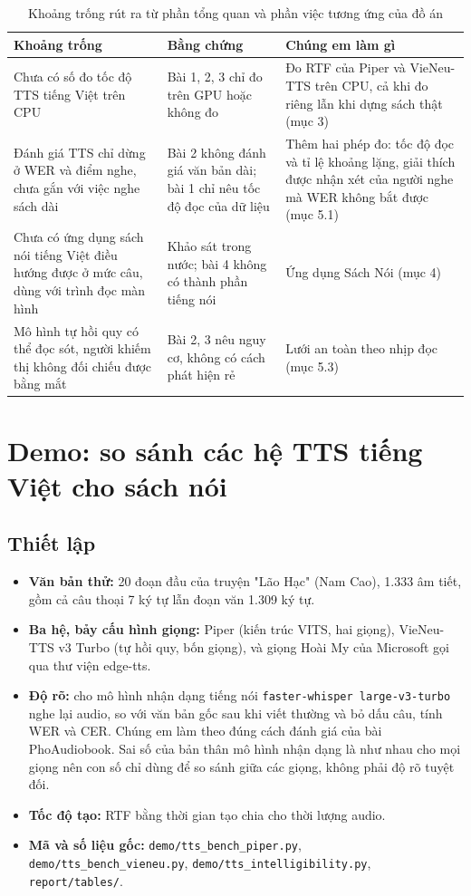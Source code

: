 \documentclass[12pt,a4paper]{article}
\providecommand{\tightlist}{\setlength{\itemsep}{2pt}\setlength{\parskip}{0pt}}
\begin{document}
{\small
\begin{longtable}[]{@{}>{\raggedright\arraybackslash}p{4.0cm}>{\raggedright\arraybackslash}p{4.4cm}>{\raggedright\arraybackslash}p{5.9cm}@{}}
\caption{Khoảng trống rút ra từ phần tổng quan và phần việc tương ứng của đồ án}\label{tab:khoang-trong}\\
\toprule\noalign{}
Khoảng trống & Bằng chứng & Chúng em làm gì \\
\midrule\noalign{}
\endhead
\bottomrule\noalign{}
\endlastfoot
Chưa có số đo tốc độ TTS tiếng Việt trên CPU & Bài 1, 2, 3 chỉ đo trên GPU hoặc không đo & Đo RTF của Piper và VieNeu-TTS trên CPU, cả khi đo riêng lẫn khi dựng sách thật (mục 3) \\
Đánh giá TTS chỉ dừng ở WER và điểm nghe, chưa gắn với việc nghe sách dài & Bài 2 không đánh giá văn bản dài; bài 1 chỉ nêu tốc độ đọc của dữ liệu & Thêm hai phép đo: tốc độ đọc và tỉ lệ khoảng lặng, giải thích được nhận xét của người nghe mà WER không bắt được (mục 5.1) \\
Chưa có ứng dụng sách nói tiếng Việt điều hướng được ở mức câu, dùng với trình đọc màn hình & Khảo sát trong nước; bài 4 không có thành phần tiếng nói & Ứng dụng Sách Nói (mục 4) \\
Mô hình tự hồi quy có thể đọc sót, người khiếm thị không đối chiếu được bằng mắt & Bài 2, 3 nêu nguy cơ, không có cách phát hiện rẻ & Lưới an toàn theo nhịp đọc (mục 5.3) \\
\end{longtable}
}

\section{Demo: so sánh các hệ TTS tiếng Việt cho sách nói}

\subsection{Thiết lập}

\begin{itemize}
\tightlist
\item
  \textbf{Văn bản thử:} 20 đoạn đầu của truyện "Lão Hạc" (Nam Cao), 1.333 âm tiết, gồm cả câu thoại 7 ký tự lẫn đoạn văn 1.309 ký tự.
\item
  \textbf{Ba hệ, bảy cấu hình giọng:} Piper (kiến trúc VITS, hai giọng), VieNeu-TTS v3 Turbo (tự hồi quy, bốn giọng), và giọng Hoài My của Microsoft gọi qua thư viện edge-tts.
\item
  \textbf{Độ rõ:} cho mô hình nhận dạng tiếng nói \texttt{faster-whisper\ large-v3-turbo} nghe lại audio, so với văn bản gốc sau khi viết thường và bỏ dấu câu, tính WER và CER. Chúng em làm theo đúng cách đánh giá của bài PhoAudiobook. Sai số của bản thân mô hình nhận dạng là như nhau cho mọi giọng nên con số chỉ dùng để so sánh giữa các giọng, không phải độ rõ tuyệt đối.
\item
  \textbf{Tốc độ tạo:} RTF bằng thời gian tạo chia cho thời lượng audio.
\item
  \textbf{Mã và số liệu gốc:} \texttt{demo/tts\_bench\_piper.py}, \texttt{demo/tts\_bench\_vieneu.py}, \texttt{demo/tts\_intelligibility.py}, \texttt{report/tables/}.
\end{itemize}
\end{document}
